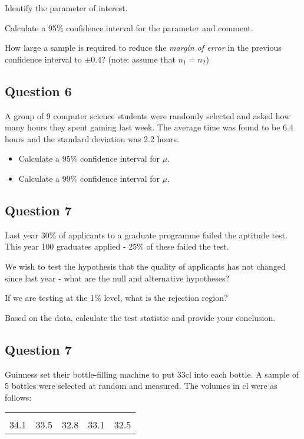 \item  Identify the parameter of interest. 
\item  Calculate a 95\% confidence interval for the parameter and comment. 
\item  How large a sample is required to reduce the \emph{margin of error} in the previous confidence interval to $\pm 0.4$? (note: assume that $n_1 = n_2$)




\subsection*{Question 6}
A group of 9 computer science students were randomly selected and asked how many hours they spent gaming last week. The average time was found to be 6.4 hours and the standard deviation was 2.2 hours.
\begin{itemize}
\item[\item ] Calculate a 95\% confidence interval for $\mu$. \item[{\bf(b)}] Calculate a 99\% confidence interval for $\mu$.
\end{itemize}






\subsection*{Question 7}
Last year 30\% of applicants to a graduate programme failed the aptitude test. This year 100 graduates applied - 25\% of these failed the test.\\[-0.2cm]

\item  We wish to test the hypothesis that the quality of applicants has not changed since last year - what are the null and alternative hypotheses? 
\item  If we are testing at the 1\% level, what is the rejection region? 
\item  Based on the data, calculate the test statistic and provide your conclusion.





\subsection*{Question 7}
Guinness set their bottle-filling machine to put 33cl into each bottle. A sample of 5 bottles were selected at random and measured. The volumes in cl were as follows:\\[-0.2cm]
\begin{center}
\begin{tabular}{|ccccc|}
\hline
&&&&\\[-0.3cm]
34.1  & 33.5 & 32.8 & 33.1 & 32.5\\[0.1cm]
\hline
\end{tabular}
\end{center}


